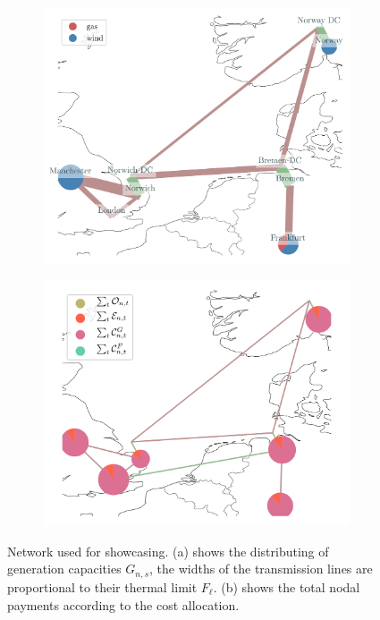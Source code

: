 \documentclass[11pt]{article}
\newcommand{\capacityGeneration}{G_{n,s}}
\newcommand{\capacityFlow}{F_{\ell}}
\begin{document}
\begin{figure}[h]
\begin{subfigure}{.5\textwidth}
\centering
 \includegraphics[width=\textwidth]{network.png}
 \caption{}
 \label{fig:network}
\end{subfigure}
\begin{subfigure}{.5\textwidth}   
    \centering
    \includegraphics[width=\textwidth]{nodal_payments.png}
    \caption{}
    \label{fig:nodal_payments}
\end{subfigure}
\caption{Network used for showcasing. (a) shows the distributing of generation capacities $\capacityGeneration$, the widths of the transmission lines are proportional to their thermal limit $\capacityFlow$. (b) shows the total nodal payments according to the cost allocation.}
\end{figure}
\end{document}
